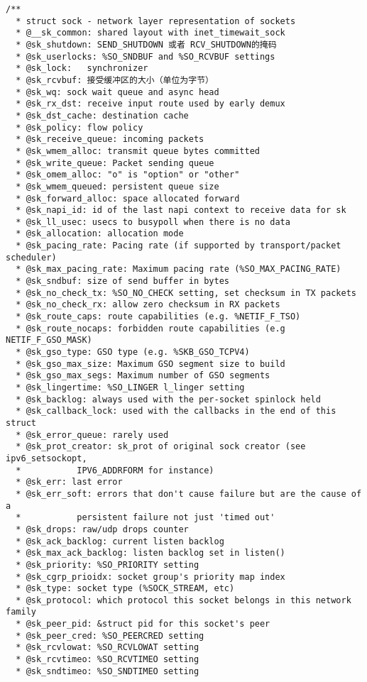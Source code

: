 \begin{verbatim}
/**
  * struct sock - network layer representation of sockets
  * @__sk_common: shared layout with inet_timewait_sock
  * @sk_shutdown: SEND_SHUTDOWN 或者 RCV_SHUTDOWN的掩码
  * @sk_userlocks: %SO_SNDBUF and %SO_RCVBUF settings
  * @sk_lock:   synchronizer
  * @sk_rcvbuf: 接受缓冲区的大小（单位为字节）
  * @sk_wq: sock wait queue and async head
  * @sk_rx_dst: receive input route used by early demux
  * @sk_dst_cache: destination cache
  * @sk_policy: flow policy
  * @sk_receive_queue: incoming packets
  * @sk_wmem_alloc: transmit queue bytes committed
  * @sk_write_queue: Packet sending queue
  * @sk_omem_alloc: "o" is "option" or "other"
  * @sk_wmem_queued: persistent queue size
  * @sk_forward_alloc: space allocated forward
  * @sk_napi_id: id of the last napi context to receive data for sk
  * @sk_ll_usec: usecs to busypoll when there is no data
  * @sk_allocation: allocation mode
  * @sk_pacing_rate: Pacing rate (if supported by transport/packet scheduler)
  * @sk_max_pacing_rate: Maximum pacing rate (%SO_MAX_PACING_RATE)
  * @sk_sndbuf: size of send buffer in bytes
  * @sk_no_check_tx: %SO_NO_CHECK setting, set checksum in TX packets
  * @sk_no_check_rx: allow zero checksum in RX packets
  * @sk_route_caps: route capabilities (e.g. %NETIF_F_TSO)
  * @sk_route_nocaps: forbidden route capabilities (e.g NETIF_F_GSO_MASK)
  * @sk_gso_type: GSO type (e.g. %SKB_GSO_TCPV4)
  * @sk_gso_max_size: Maximum GSO segment size to build
  * @sk_gso_max_segs: Maximum number of GSO segments
  * @sk_lingertime: %SO_LINGER l_linger setting
  * @sk_backlog: always used with the per-socket spinlock held
  * @sk_callback_lock: used with the callbacks in the end of this struct
  * @sk_error_queue: rarely used
  * @sk_prot_creator: sk_prot of original sock creator (see ipv6_setsockopt,
  *           IPV6_ADDRFORM for instance)
  * @sk_err: last error
  * @sk_err_soft: errors that don't cause failure but are the cause of a
  *           persistent failure not just 'timed out'
  * @sk_drops: raw/udp drops counter
  * @sk_ack_backlog: current listen backlog
  * @sk_max_ack_backlog: listen backlog set in listen()
  * @sk_priority: %SO_PRIORITY setting
  * @sk_cgrp_prioidx: socket group's priority map index
  * @sk_type: socket type (%SOCK_STREAM, etc)
  * @sk_protocol: which protocol this socket belongs in this network family
  * @sk_peer_pid: &struct pid for this socket's peer
  * @sk_peer_cred: %SO_PEERCRED setting
  * @sk_rcvlowat: %SO_RCVLOWAT setting
  * @sk_rcvtimeo: %SO_RCVTIMEO setting
  * @sk_sndtimeo: %SO_SNDTIMEO setting

\end{verbatim}
